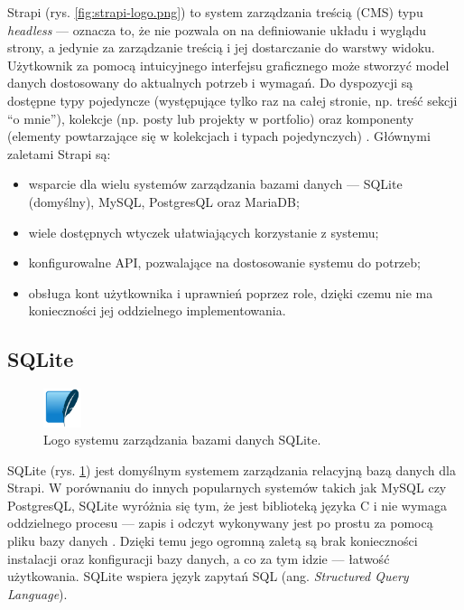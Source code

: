 \documentclass[a4paper, 12pt, twoside]{article}
\numberwithin{figure}{section}
\begin{document}
\begin{sloppypar}
Strapi (rys. \ref{fig:strapi-logo.png}) to system zarządzania treścią (CMS) typu \textit{headless} --- oznacza to, że nie pozwala on na definiowanie układu i wyglądu strony, a jedynie za zarządzanie treścią i jej dostarczanie do warstwy widoku. Użytkownik za pomocą intuicyjnego interfejsu graficznego może stworzyć model danych dostosowany do aktualnych potrzeb i wymagań. Do dyspozycji są dostępne typy pojedyncze (występujące tylko raz na całej stronie, np. treść sekcji ``o mnie''), kolekcje (np. posty lub projekty w portfolio) oraz komponenty (elementy powtarzające się w kolekcjach i typach pojedynczych) \cite{strapifeatures}. Głównymi zaletami Strapi są:
\begin{itemize}
    \item wsparcie dla wielu systemów zarządzania bazami danych --- SQLite (domyślny), MySQL, PostgresQL oraz MariaDB;
    \item wiele dostępnych wtyczek ułatwiających korzystanie z systemu;
    \item konfigurowalne API, pozwalające na dostosowanie systemu do potrzeb;
    \item obsługa kont użytkownika i uprawnień poprzez role, dzięki czemu nie ma konieczności jej oddzielnego implementowania.
\end{itemize}



\subsection*{SQLite}

\begin{figure}[H] 
    \centering
        \includegraphics[width=0.1\textwidth]{images/sqlite-logo.png}
   \caption{Logo systemu zarządzania bazami danych SQLite.}
   \label{fig:sqlite-logo.png}
\end{figure}

SQLite (rys. \ref{fig:sqlite-logo.png}) jest domyślnym systemem zarządzania relacyjną bazą danych dla Strapi. W porównaniu do innych popularnych systemów takich jak MySQL czy PostgresQL, SQLite wyróżnia się tym, że jest biblioteką języka C i nie wymaga oddzielnego procesu --- zapis i odczyt wykonywany jest po prostu za pomocą pliku bazy danych \cite{sqlite}. Dzięki temu jego ogromną zaletą są brak konieczności instalacji oraz konfiguracji bazy danych, a co za tym idzie --- łatwość użytkowania. SQLite wspiera język zapytań SQL (ang. \textit{Structured Query Language}).


\end{sloppypar}
\end{document}
